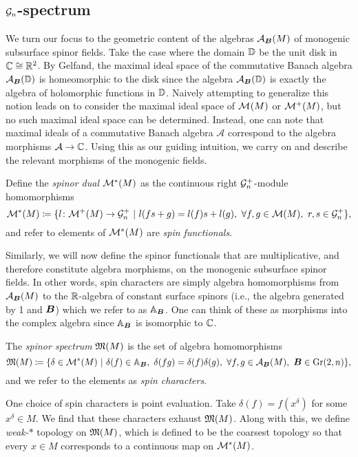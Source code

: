 \subsection{$\mathcal{G}_n$-spectrum}

We turn our focus to the geometric content of the algebras $\mathcal{A}_{\boldsymbol{B}}(M)$ of monogenic subsurface spinor fields. Take the case where the domain $\mathbb{D}$ be the unit disk in $\mathbb{C} \cong \mathbb{R}^2$.  By Gelfand, the maximal ideal space of the commutative Banach algebra $\mathcal{A}_{\boldsymbol{B}}(\mathbb{D})$ is homeomorphic to the disk since the algebra $\mathcal{A}_{\boldsymbol{B}}(\mathbb{D})$ is exactly the algebra of holomorphic functions in $\mathbb{D}$. Naively attempting to generalize this notion leads on to consider the maximal ideal space of $\mathcal{M}^{}(M)$ or $\mathcal{M}^{+}(M)$, but no such maximal ideal space can be determined. Instead, one can note that maximal ideals of a commutative Banach algebra $\mathcal{A}$ correspond to the algebra morphisms $\mathcal{A} \to \mathbb{C}$.  Using this as our guiding intuition, we carry on and describe the relevant morphisms of the monogenic fields.



\begin{definition}
    Define the \emph{spinor dual} $\mathcal{M}^*(M)$ as the continuous right $\mathcal{G}_n^+$-module homomorphisms
    \begin{equation}
        \mathcal{M}^*(M) \coloneqq \{ l \colon \mathcal{M}^+(M) \to \mathcal{G}_n^+ ~\vert~ l(fs+g) = l(f)s+l(g), ~\forall f,g \in \mathcal{M}(M), ~r,s \in \mathcal{G}_n^+ \},
    \end{equation}
    and refer to elements of $\mathcal{M}^*(M)$ are \emph{spin functionals}. 
    \end{definition}
Similarly, we will now define the spinor functionals that are multiplicative, and therefore constitute algebra morphisms, on the monogenic subsurface spinor fields. In other words, spin characters are simply algebra homomorphisms from $\mathcal{A}_{\boldsymbol{B}}(M)$ to the $\mathbb{R}$-algebra of constant surface spinors (i.e., the algebra generated by 1 and $\boldsymbol{B}$) which we refer to as $\mathbb{A}_{\boldsymbol{B}}$. One can think of these as morphisms into the complex algebra since $\mathbb{A}_{\boldsymbol{B}}$ is isomorphic to $\mathbb{C}$.
\begin{definition}
    The \emph{spinor spectrum} $\mathfrak{M}(M)$ is the set of algebra homomorphisms
    \[
        \mathfrak{M}(M) \coloneqq \{ \delta \in \mathcal{M}^*(M) ~\vert~ \delta(f) \in \mathbb{A}_{\boldsymbol{B}},~\delta(fg) = \delta(f)\delta(g),~ \forall f,g \in \mathcal{A}_{\boldsymbol{B}}(M),~  \boldsymbol{B} \in \operatorname{Gr}(2,n)\},
    \]
    and we refer to the elements as \emph{spin characters}.
\end{definition}
One choice of spin characters is point evaluation. Take $\delta(f)=f(x^\delta)$ for some $x^\delta \in M$. We find that these characters exhaust $\mathfrak{M}(M)$. Along with this, we define \emph{weak-$\ast$} topology on $\mathfrak{M}(M)$, which is defined to be the coarsest topology so that every $x \in M$ corresponds to a continuous map on $\mathcal{M}^*(M)$. 

